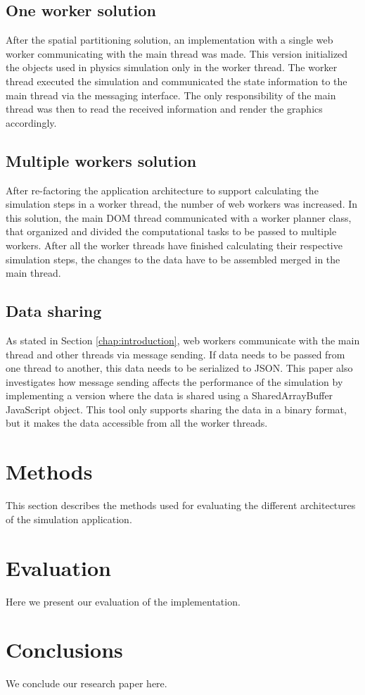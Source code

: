 \documentclass[conference]{IEEEtran}
\begin{document}
\subsection{One worker solution} 
\label{sec:1workers}

After the spatial partitioning solution, an implementation with a single web worker communicating with the main thread was made. This version initialized the objects used
in physics simulation only in the worker thread. The worker thread executed the simulation and communicated the state information to the main thread via the messaging 
interface. The only responsibility of the main thread was then to read the received information and render the graphics accordingly.

\subsection{Multiple workers solution} 
\label{sec:nworkers}

After re-factoring the application architecture to support calculating the simulation steps in a worker thread, the number of web workers was increased. In this solution,
the main DOM thread communicated with a worker planner class, that organized and divided the computational tasks to be passed to multiple workers. After all the worker
threads have finished calculating their respective simulation steps, the changes to the data have to be assembled merged in the main thread.

\subsection{Data sharing}

As stated in Section \ref{chap:introduction}, web workers communicate with the main thread and other threads via message sending. If data needs to be passed from one thread
to another, this data needs to be serialized to JSON. This paper also investigates how message sending affects the performance of the simulation by implementing a version
where the data is shared using a SharedArrayBuffer JavaScript object. This tool only supports sharing the data in a binary format, but it makes the data accessible from all the worker threads.

\section{Methods}
\label{sec:methods}

This section describes the methods used for evaluating the different architectures of the simulation application.

\section{Evaluation}
\label{sec:sec2}

Here we present our evaluation of the implementation.

\section{Conclusions}
\label{sec:conc}

We conclude our research paper here.

\printbibliography[title={References}]
\end{document}
